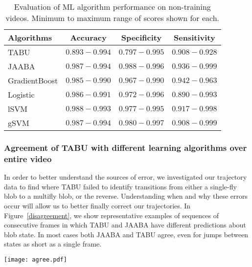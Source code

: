 \documentclass[11pt]{article}
\begin{document}
{\begin{table}[ht]
\centering
\caption{Evaluation of ML algorithm performance on non-training videos. Minimum to maximum range of scores shown for each.} 
\label{PerformanceOnIndependent}
\begin{tabular}{lccc}
	\hline
	Algorithms  &  Accuracy  &  Specificity &  Sensitivity  \\ 
	\hline
	TABU  & $0.893-0.994$ & $0.797-0.995$ & $0.908-0.928$ \\
	JAABA & $0.987-0.994$ & $0.988-0.996$ & $0.936-0.999$ \\
	GradientBoost & $0.985-0.990$ & $0.967-0.990$ & $0.942-0.963$ \\
	Logistic & $0.986-0.991$ & $0.972-0.996$ & $0.890-0.993$ \\
	lSVM & $0.988-0.993$ & $0.977-0.995$ & $0.917-0.998$ \\
	gSVM & $0.987-0.994$ & $0.980-0.997$ & $0.908-0.999$ \\
	\hline
\end{tabular}
\vspace*{-0.15in}
\end{table}

\subsubsection*{Agreement of TABU with different learning algorithms over entire video}
\vspace*{-0.15in}
In order to better understand the sources of error, we investigated our trajectory data to find where TABU failed to identify transitions from either a single-fly blob to a multifly blob, or the reverse. Understanding when and why these errors occur will allow us to better finally correct our trajectories. In Figure~\ref{disagreement}, we show representative examples of sequences of consecutive frames in which TABU and JAABA have different predictions about blob state. In most cases both JAABA and TABU agree, even for jumps between states as short as a single frame.  %

\begin{figure*}[h]
\begin{center}
\caption{Representative transitions from single-fly to multifly along trajectory fragments. The TABU predictions are shown in red, the true state is shown in black, and JAABA predictions in blue.}
\label{disagreement}
\texttt{[image: agree.pdf]}
\vspace*{-0.1in}
\end{center}
\end{figure*}


}
\end{document}
